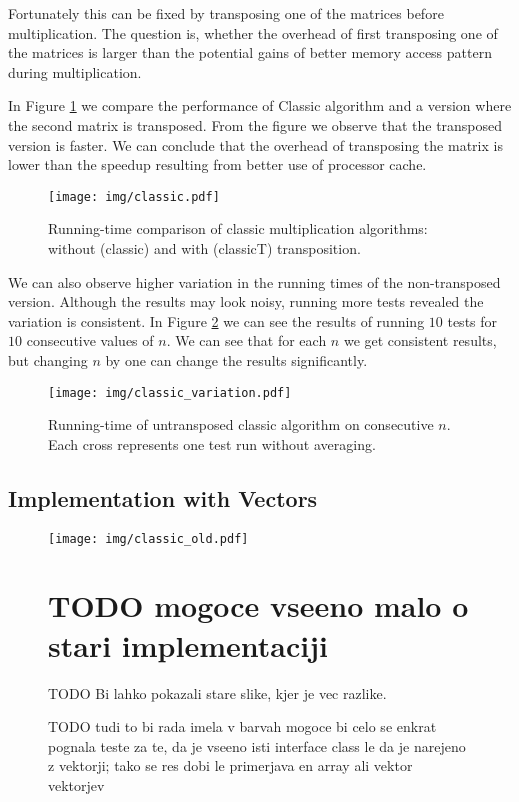 \documentclass[a4paper,11pt]{article}
\begin{document}
Fortunately this can be fixed by transposing one of the matrices before multiplication. The question is, whether the overhead of first transposing one of the matrices is larger than the potential gains of better memory access pattern during multiplication.

In Figure \ref{fig:classic} we compare the performance of Classic algorithm and a version where the second matrix is transposed.
From the figure we observe that the transposed version is faster. We can conclude that the overhead of transposing the matrix is lower than the speedup resulting from better use of processor cache.

\begin{figure}[h]
\centering
\texttt{[image: img/classic.pdf]}
\caption{Running-time comparison of classic multiplication algorithms: without (\textsf{classic}) and with (\textsf{classicT}) transposition.}
\label{fig:classic}
\end{figure}

We can also observe higher variation in the running times of the non-transposed version. Although the results may look noisy, running more tests revealed the variation is consistent. In Figure \ref{fig:classic_var} we can see the results of running $10$ tests for $10$ consecutive values of $n$. We can see that for each $n$ we get consistent results, but changing $n$ by one can change the results significantly.  

\begin{figure}[h]
\centering
\texttt{[image: img/classic\_variation.pdf]}

\caption{Running-time of untransposed classic algorithm on consecutive $n$. Each cross represents one test run without averaging.}
\label{fig:classic_var}
\end{figure}

\subsection{Implementation with Vectors}

\begin{figure}[h]
\centering
\texttt{[image: img/classic\_old.pdf]}

\section{TODO mogoce vseeno malo o stari implementaciji}
TODO Bi lahko pokazali stare slike, kjer je vec razlike.

\caption{TODO tudi to bi rada imela v barvah mogoce bi celo se enkrat pognala teste za te, da je vseeno isti interface class le da je narejeno z vektorji; tako se res dobi le primerjava en array ali vektor vektorjev}
\label{fig:classic_old}
\end{figure}
\end{document}
